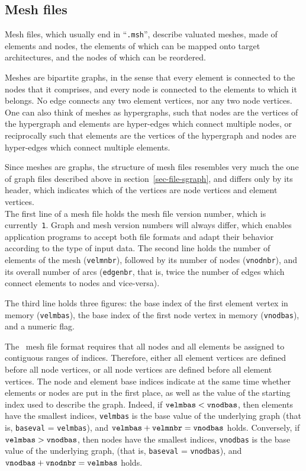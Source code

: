 \subsection{Mesh files}
\label{sec-file-smesh}

Mesh files, which usually end in ``\texttt{\@.msh}'', describe valuated
meshes, made of elements and nodes, the elements of which can be
mapped onto target architectures, and the nodes of which can be
reordered.

Meshes are bipartite graphs, in the sense that every element is
connected to the nodes that it comprises, and every node is connected
to the elements to which it belongs. No edge connects any two element
vertices, nor any two node vertices.  One can also think of meshes as
hypergraphs, such that nodes are the vertices of the hypergraph and
elements are hyper-edges which connect multiple nodes, or reciprocally
such that elements are the vertices of the hypergraph and nodes are
hyper-edges which connect multiple elements.

Since meshes are graphs, the structure of mesh files resembles very
much the one of graph files described above in
section~\ref{sec-file-sgraph}, and differs only by its header, which
indicates which of the vertices are node vertices and element
vertices.
\\

The first line of a mesh file holds the mesh file version number,
which is currently~\texttt{1}. Graph and mesh version numbers will always
differ, which enables application programs to accept both file formats
and adapt their behavior according to the type of input data.  The
second line holds the number of elements of the mesh (\texttt{velmnbr}),
followed by its number of nodes (\texttt{vnodnbr}), and its overall
number of arcs (\texttt{edgenbr}, that is, twice the number of edges
which connect elements to nodes and vice-versa).

The third line holds three figures: the base index of the first
element vertex in memory (\texttt{velmbas}), the base index of the first
node vertex in memory (\texttt{vnodbas}), and a numeric flag.

The \scotch\ mesh file format requires that all nodes and all elements
be assigned to contiguous ranges of indices. Therefore, either all
element vertices are defined before all node vertices, or all node
vertices are defined before all element vertices. The node and element
base indices indicate at the same time whether elements or nodes are
put in the first place, as well as the value of the starting index
used to describe the graph. Indeed, if
$\mbox{\texttt{velm}}\-\mbox{\texttt{bas}} <
\mbox{\texttt{vnod}}\-\mbox{\texttt{bas}}$, then elements have the 
smallest indices, \texttt{velmbas} is the base value of the underlying
graph (that is, \texttt{baseval} = \texttt{velmbas}), and
$\mbox{\texttt{velmbas}} + \mbox{\texttt{velmnbr}} =
\mbox{\texttt{vnodbas}}$
holds. Conversely, if $\mbox{\texttt{velm}}\-\mbox{\texttt{bas}}
> \mbox{\texttt{vnod}}\-\mbox{\texttt{bas}}$, then nodes have the
smallest indices, \texttt{vnodbas} is the base value of the underlying
graph, (that is, \texttt{baseval} = \texttt{vnodbas}), and
$\mbox{\texttt{vnodbas}} + \mbox{\texttt{vnodnbr}} =
\mbox{\texttt{velmbas}}$ holds.

